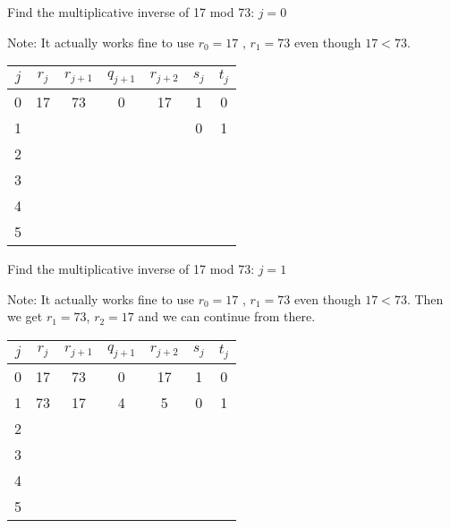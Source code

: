 \documentclass{beamer}
\begin{document}
\begin{frame}{Find the multiplicative inverse of 17 mod 73: $j=0$}

Note: It actually works fine to use $r_0=17$ , $r_1=73$ even though $17<73$.

\vspace{1em}

\begin{tabular}{|c|c|c|c|c|c|c|}\hline
$j$   &  $r_{j}$    & $r_{j+1}$ & $q_{j+1}$ & $r_{j+2}$ & $s_j$ & $t_j$ \\ \hline\hline
0     &  17         &  73       &    0      &   17      &  1    &   0   \\ \hline
1     &             &           &           &           &  0    &   1   \\ \hline
2     &             &           &           &           &       &       \\ \hline
3     &             &           &           &           &       &       \\ \hline
4     &             &           &           &           &       &       \\ \hline
5     &             &           &           &           &       &       \\ \hline
\end{tabular}

\end{frame}

\begin{frame}{Find the multiplicative inverse of 17 mod 73: $j=1$}

Note: It actually works fine to use $r_0=17$ , $r_1=73$ even though $17<73$.
Then we get $r_1=73$, $r_2=17$ and we can continue from there.

\vspace{1em}

\begin{tabular}{|c|c|c|c|c|c|c|}\hline
$j$   &  $r_{j}$    & $r_{j+1}$ & $q_{j+1}$ & $r_{j+2}$ & $s_j$ & $t_j$ \\ \hline\hline
0     &  17         &  73       &    0      &   17      &  1    &   0   \\ \hline
1     &  73         &  17       &    4      &    5      &  0    &   1   \\ \hline
2     &             &           &           &           &       &       \\ \hline
3     &             &           &           &           &       &       \\ \hline
4     &             &           &           &           &       &       \\ \hline
5     &             &           &           &           &       &       \\ \hline
\end{tabular}

\end{frame}
\end{document}
